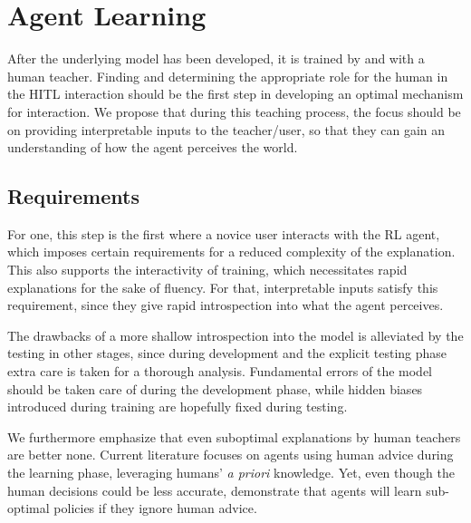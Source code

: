 \documentclass[twoside,11pt]{article}
\begin{document}
\section{Agent Learning}


After the underlying model has been developed, it is trained by and with a human teacher.
Finding and determining the appropriate role for the human in the HITL interaction should be the first step in developing an optimal mechanism for interaction. We propose that during this teaching process, the focus should be on providing interpretable inputs to the teacher/user, so that they can gain an understanding of how the agent perceives the world.

\subsection{Requirements}
For one, this step is the first where a novice user interacts with the RL agent, which imposes certain requirements for a reduced complexity of the explanation. This also supports the interactivity of training, which necessitates rapid explanations for the sake of fluency. For that, interpretable inputs satisfy this requirement, since they give rapid introspection into what the agent perceives.

The drawbacks of a more shallow introspection into the model is alleviated by the testing in other stages, since during development and the explicit testing phase extra care is taken for a thorough analysis. Fundamental errors of the model should be taken care of during the development phase, while hidden biases introduced during training are hopefully fixed during testing.

We furthermore emphasize that even suboptimal explanations by human teachers are better none. Current literature focuses on agents using human advice during the learning phase, leveraging humans' \emph{a priori} knowledge. Yet, even though the human decisions could be less accurate, \cite{Zhang:2020:human_out_loop} demonstrate that agents will learn sub-optimal policies if they ignore human advice. 
\end{document}
